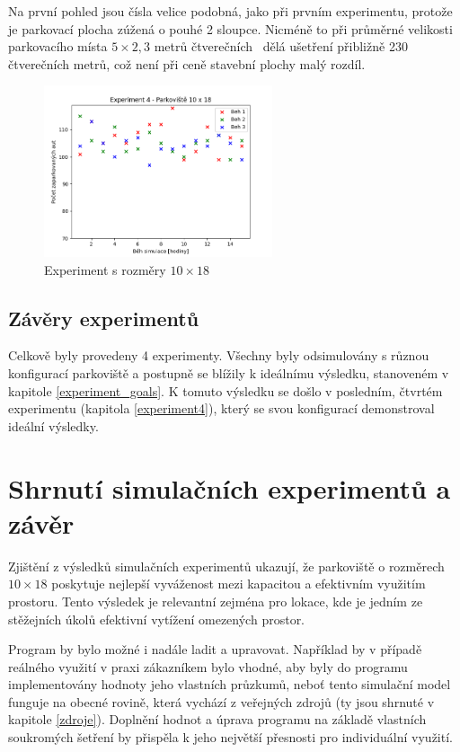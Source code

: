 \documentclass[11pt, a4paper]{article}
\begin{document}
Na první pohled jsou čísla velice podobná, jako při prvním experimentu, protože je parkovací plocha zúžená o pouhé 2 sloupce. Nicméně to při průměrné velikosti parkovacího místa $5 \times 2,3$ metrů čtverečních~\cite{France_2022} dělá ušetření přibližně 230 čtverečních metrů, což není při ceně stavební plochy malý rozdíl.

\begin{figure}[ht]
  \centering
  \includegraphics[width=0.6\textwidth]{img/exp4.png}
  \caption{Experiment s rozměry $10 \times 18$}
  \label{exp4}
\end{figure}

\newpage

\subsection{Závěry experimentů}

Celkově byly provedeny 4 experimenty. Všechny byly odsimulovány s různou konfigurací parkoviště a postupně se blížily k ideálnímu výsledku, stanoveném v kapitole \ref{experiment_goals}. K tomuto výsledku se došlo v posledním, čtvrtém experimentu (kapitola \ref{experiment4}), který se svou konfigurací demonstroval ideální výsledky.

\section{Shrnutí simulačních experimentů a závěr}

Zjištění z výsledků simulačních experimentů ukazují, že parkoviště o rozměrech $10 \times 18$ poskytuje nejlepší vyváženost mezi kapacitou a efektivním využitím prostoru. Tento výsledek je relevantní zejména pro lokace, kde je jedním ze stěžejních úkolů efektivní vytížení omezených prostor.

Program by bylo možné i nadále ladit a upravovat. Například by v případě reálného využití v praxi zá\-kaz\-ní\-kem bylo vhodné, aby byly do programu implementovány hodnoty jeho vlastních průzkumů, neboť tento simulační model funguje na obecné rovině, která vychází z veřejných zdrojů (ty jsou shrnuté v kapitole \ref{zdroje}). Doplnění hodnot a úprava programu na základě vlastních soukromých šetření by přispěla k jeho největší přesnosti pro individuální využití.

\newpage


\renewcommand{\refname}{Použité zdroje}

\label{zdroje}
\end{document}
